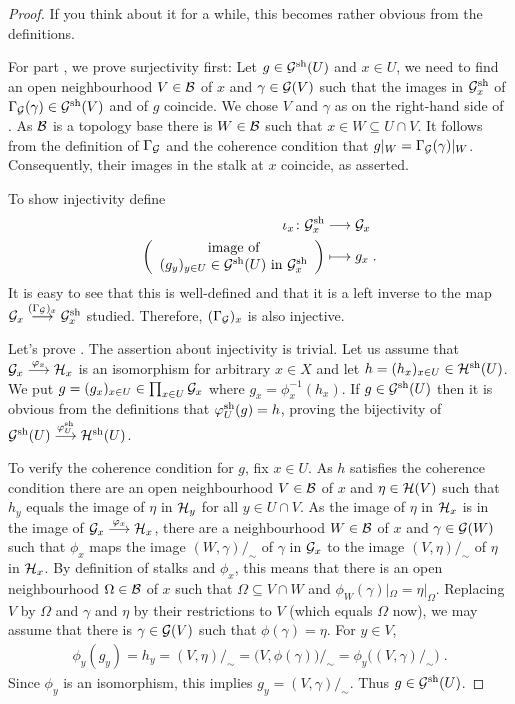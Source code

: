 \documentclass[a4paper,parskip=half,numbers=enddot, DIV=12]{scrreprt}
\begin{document}
\begin{proof}
	 If you think about it for a while, this becomes rather obvious from the definitions.
	
	For part , we prove surjectivity first: Let $g\in\mathcal{G}^{\mathrm{sh}}(U)$ and $x\in U$, we need to find an open neighbourhood $V\in \mathcal{B}$ of $x$ and $\gamma\in \mathcal{G}(V)$ such that the images in $\mathcal{G}^{\mathrm{sh}}_x$ of $\Gamma_{\mathcal{G}}(\gamma)\in \mathcal{G}^{\mathrm{sh}}(V)$ and of $g$ coincide. We chose $V$ and $\gamma$ as on the right-hand side of . As $\mathcal{B}$ is a topology base there is $W\in\mathcal{B}$ such that $x\in W\subseteq U\cap V$. It follows from the definition of $\Gamma_{\mathcal{G}}$ and the coherence condition that $g|_W = \Gamma_{\mathcal{G}}(\gamma)|_W$. Consequently, their images in the stalk at $x$ coincide, as asserted.
	
	To show injectivity define
	\begin{align*}
	    \iota_x\colon \Gg^\sh_x &\morphism \Gg_x\\
	    \bigg(\begin{array}{c}
		    \text{image of}\\
		    (g_y)_{y\in U} \in \Gg^\sh(U) \text{ in } \Gg^\sh_x 
	    \end{array}\bigg) &\longmapsto g_x\;.
	\end{align*}
	It is easy to see that this is well-defined and that it is a left inverse to the map $\Gg_x\morphism[(\Gamma_{\Gg})_x] \Gg^\sh_x$ studied. Therefore, $(\Gamma_{\mathcal{G}})_x$  is also injective.
	
	Let's prove . The assertion about injectivity is trivial. Let us assume that $\Gg_x\morphism[\phi_x]\Hh_x$ is an isomorphism for arbitrary $x\in X$ and let $h=(h_x)_{x\in U}\in \mathcal{H}^{\mathrm{sh}}(U)$. We put $g=(g_x)_{x\in U} \in \prod_{x\in U}\mathcal{G}_x$ where $g_x = \phi_x^{-1} (h_x)$. If $g\in \mathcal{G}^{\mathrm{sh}}(U)$ then it is obvious from the definitions that $\varphi_U^{\mathrm{sh}}(g) = h$, proving the bijectivity of $\Gg^\sh(U) \morphism[\phi_U^\sh] \Hh^\sh(U)$.
	
	To verify the coherence condition for $g$, fix $x\in U$. As $h$ satisfies the coherence condition there are an open neighbourhood $V\in\mathcal{B}$ of $x$ and $\eta\in\mathcal{H}(V)$ such that $h_y$ equals the image of $\eta$ in $\mathcal{H}_y$ for all $y\in U\cap V$. As the image of $\eta$ in $\mathcal{H}_x$ is in the image of $\Gg_x\morphism[\phi_x]\Hh_x$, there are a neighbourhood $W\in\mathcal{B}$ of $x$ and $\gamma\in\mathcal{G}(W)$ such that $\phi_x$ maps the image $(W,\gamma)/_\sim$ of $\gamma$ in $\mathcal{G}_x$ to the image $(V,\eta)/_\sim$ of $\eta$ in $\mathcal{H}_x$. By definition of stalks and $\phi_x$, this means that there is an open neighbourhood $\Omega\in\mathcal{B}$ of $x$ such that $\Omega\subseteq V\cap W$ and $ \phi_W(\gamma)|_\Omega = \eta|_\Omega$. Replacing $V$ by $\Omega$ and $\gamma$ and $\eta$ by their restrictions to $V$ (which equals $\Omega$ now), we may assume that there is $\gamma\in\mathcal{G}(V)$ such that $\phi(\gamma) = \eta$. For $y\in V$, \begin{align*}
		\phi_y(g_y) = h_y=(V,\eta)/_\sim = \big(V,\phi(\gamma)\big)/_\sim = \phi_y\big((V,\gamma)/_\sim\big)\;.
	\end{align*}
	Since $\phi_y$ is an isomorphism, this implies $g_y = (V,\gamma)/_\sim$. Thus $g\in \mathcal{G}^{\mathrm{sh}}(U)$.
	

\end{proof}
\end{document}
